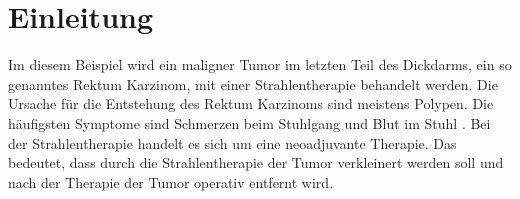 \section{Einleitung}
\label{sec:Einleitung}

Im diesem Beispiel wird ein maligner Tumor im letzten Teil des Dickdarms, ein so genanntes Rektum Karzinom, mit einer Strahlentherapie behandelt werden.
Die Ursache für die Entstehung des Rektum Karzinoms sind meistens Polypen. Die häufigsten Symptome sind Schmerzen
beim Stuhlgang und Blut im Stuhl \cite{Rektum}.
Bei der Strahlentherapie handelt es sich um eine neoadjuvante Therapie.
Das bedeutet, dass durch die Strahlentherapie der Tumor verkleinert werden soll
und nach der Therapie der Tumor operativ entfernt wird.
